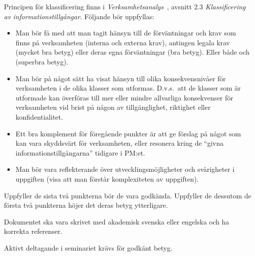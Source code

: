 \documentclass[a4paper]{llncs}
\begin{document}
\begin{enumerate}
\begin{solution}
      Principen för klassificering finns 
      i \emph{Verksamhetsanalys}~\cite{MSB2011v}, avsnitt 2.3 
      \emph{Klassificering av informationstillgångar}.
      Följande bör uppfyllas:
      \begin{itemize}
        \item Man bör få med att man tagit hänsyn till de förväntningar och krav 
          som finns på verksamheten (interna och externa krav), antingen legala 
          krav (mycket bra betyg) eller deras egna förväntningar (bra betyg).
          Eller både och (superbra betyg).
        \item Man bör på något sätt ha visat hänsyn till olika konsekvensnivåer 
          för verksamheten i de olika klasser som utformas.
          D.v.s.\ att de klasser som är utformade kan överföras till mer eller 
          mindre allvarliga konsekvenser för verksamheten vid brist på någon av 
          tillgänglighet, riktighet eller konfidentialitet.
        \item Ett bra komplement för föregående punkter är att ge förslag på 
          något som kan vara skyddsvärt för verksamheten, eller resonera kring de 
          \enquote{givna informationstillgångarna} tidigare i PM:et.
        \item Man bör vara reflekterande över utvecklingsmöjligheter och 
          svårigheter i uppgiften (visa att man förstår komplexiteten av 
          uppgiften).
      \end{itemize}
      Uppfyller de sista två punkterna bör de vara godkända.
      Uppfyller de dessutom de första två punkterna höjer det deras betyg 
      ytterligare.
    \end{solution}
\end{enumerate}

Dokumentet ska vara skrivet med akademisk svenska eller engelska och ha 
korrekta referenser.

Aktivt deltagande i seminariet krävs för godkänt betyg.


\printbibliography{}
\end{document}
